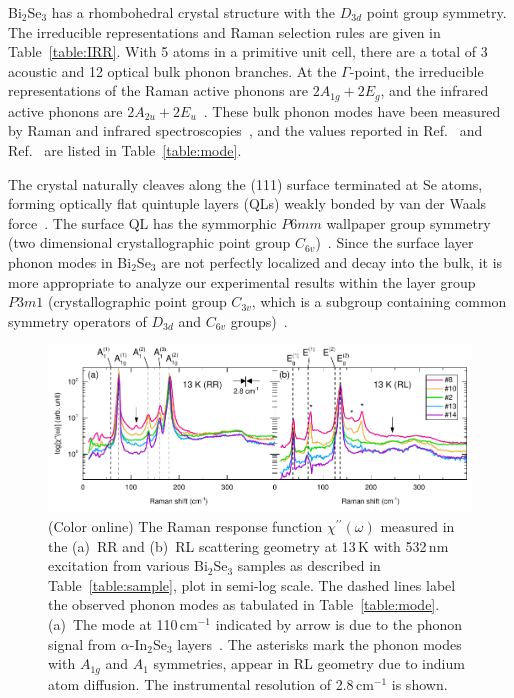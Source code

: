\documentclass[reprint,aps,pra,superscriptaddress,amsmath,amssymb,linenumbers,longbibliography]{revtex4-1}
\begin{document}
Bi$_2$Se$_3$ has a rhombohedral crystal structure with the $D_{3d}$ point group symmetry.
The irreducible representations and Raman selection rules are given in Table~\ref{table:IRR}.
With 5 atoms in a primitive unit cell, there are a total of 3 acoustic and 12 optical bulk phonon branches.
At the $\Gamma$-point, the irreducible representations of the Raman active phonons are $2A_{1g}+2E_g$, and the infrared active phonons are $2A_{2u}+2E_u$~\cite{Kohler1974,Richter1977}.
These bulk phonon modes have been measured by Raman and infrared spectroscopies~\cite{Kohler1974,Richter1977,LaForge2010,Zhao2011,Zhang2011,Gnezdilov2011,Kim2012,Humlicek2014,Irfan2014,Eddrief2014,Yan2015,Zhang2016}, and the values reported in Ref.~\cite{LaForge2010} and Ref.~\cite{Gnezdilov2011} are listed in Table~\ref{table:mode}.

The crystal naturally cleaves along the (111) surface terminated at Se atoms, forming optically flat quintuple layers (QLs) weakly bonded by van der Waals force~\cite{Kohler1974}.
The surface QL has the symmorphic $P6mm$ wallpaper group symmetry (two dimensional crystallographic point group $C_{6v}$)~\cite{Terzibaschian1986,Li2013Mar,Slager2013}.
Since the surface layer phonon modes in Bi$_2$Se$_3$ are not perfectly localized and decay into the bulk, it is more appropriate to analyze our experimental results within the layer group $P3m1$ (crystallographic point group $C_{3v}$, which is a subgroup containing common symmetry operators of $D_{3d}$ and $C_{6v}$ groups)~\cite{Li2013Mar}.
%
\begin{figure}[t]
	\includegraphics[width=17cm]{Fig1.pdf}
	\caption{\label{fig:1}(Color online)
		The Raman response function $\chi^{\prime\prime}(\omega)$ measured in the (a)~RR and (b)~RL scattering geometry at 13\,K with 532\,nm excitation from various Bi$_2$Se$_3$ samples as described in Table~\ref{table:sample}, plot in semi-log scale.
		The dashed lines label the observed phonon modes as tabulated in Table~\ref{table:mode}.
		(a)~The mode at 110\,cm$^{-1}$ indicated by arrow is due to the phonon signal from $\alpha$-In$_2$Se$_3$ layers~\cite{Lewandowska2001}.
		The asterisks mark the phonon modes with $A_{1g}$ and $A_1$ symmetries, appear in RL geometry due to indium atom diffusion.
		The instrumental resolution of 2.8\,cm$^{-1}$ is shown.
	}
\end{figure}
\end{document}
